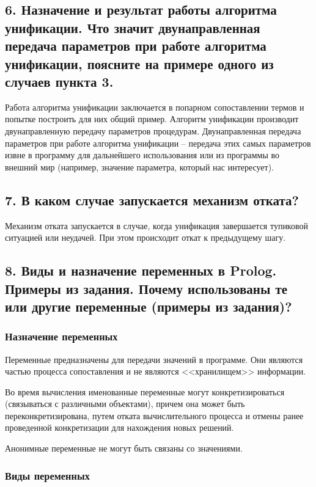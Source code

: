 \documentclass[a4paper,12pt]{article}
\begin{document}
	\subsection*{6.	Назначение и результат работы алгоритма унификации. Что значит двунаправленная передача параметров при работе алгоритма унификации, поясните на примере одного из случаев пункта  3.}
	
	Работа алгоритма унификации заключается в попарном сопоставлении термов и попытке построить для них общий пример. Алгоритм унификации производит двунаправленную передачу параметров процедурам. Двунаправленная
	передача параметров при работе алгоритма унификации – передача этих самых
	параметров извне в программу для дальнейшего использования или из программы во внешний мир (например, значение параметра, который нас интересует).
	
	\subsection*{7.	В каком случае запускается механизм отката?}
	
	Механизм отката запускается в случае, когда унификация завершается тупиковой ситуацией или неудачей. При этом происходит откат к предыдущему
	шагу.
	
	\subsection*{8.	Виды и назначение переменных в Prolog. Примеры из задания.  Почему использованы те или другие переменные (примеры из задания)?}
	
	\subsubsection*{Назначение переменных}
	
	Переменные предназначены для передачи значений в программе. Они являются частью процесса сопоставления и не являются <<хранилищем>> информации.
	
	Во время вычисления именованные переменные могут конкретизироваться
	(связываться с различными объектами), причем она может быть переконкретизирована, путем отката вычислительного процесса и отмены ранее проведенной конкретизации для нахождения новых решений.
	
	Анонимные переменные не могут быть связаны со значениями.
	
	\subsubsection*{Виды переменных}
	
\end{document}
